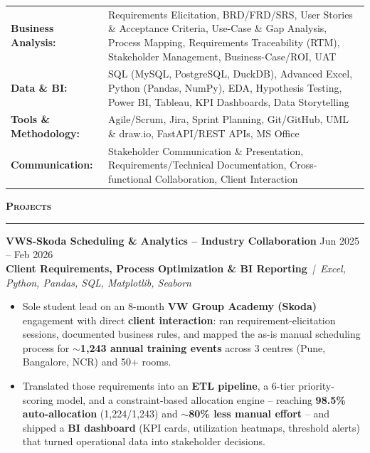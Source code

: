 \documentclass[a4paper,10pt]{article}
\newcommand{\sectionHeader}[2]{%
  \vspace{3.5pt}%
  \noindent%
  {\normalsize\bfseries\color{HeaderDark}#2\enspace\textsc{#1}}%
  \\[-6pt]%
  {\color{SectionLine}\rule{\textwidth}{1pt}}%
  \vspace{1pt}\par%
}
\newcommand{\projectEntry}[4]{%
  \vspace{1pt}%
  \noindent\textbf{\color{HeaderDark}#1} \hfill {\small\color{SubText}#2}\\[-4pt]%
  {\scriptsize\color{AccentTeal}\textbf{#3}} {\scriptsize\color{TechTag}\textit{\,|\, #4}}%
  \vspace{0pt}\par%
}
\begin{document}
\vspace{1pt}
\begin{tabularx}{\textwidth}{@{}l X@{}}
  {\small\textbf{\color{HeaderDark}Business Analysis:}} & {\small Requirements Elicitation, BRD/FRD/SRS, User Stories \& Acceptance Criteria, Use-Case \& Gap Analysis, Process Mapping, Requirements Traceability (RTM), Stakeholder Management, Business-Case/ROI, UAT} \\[2pt]
  {\small\textbf{\color{HeaderDark}Data \& BI:}} & {\small SQL (MySQL, PostgreSQL, DuckDB), Advanced Excel, Python (Pandas, NumPy), EDA, Hypothesis Testing, Power BI, Tableau, KPI Dashboards, Data Storytelling} \\[2pt]
  {\small\textbf{\color{HeaderDark}Tools \& Methodology:}} & {\small Agile/Scrum, Jira, Sprint Planning, Git/GitHub, UML \& draw.io, FastAPI/REST APIs, MS Office} \\[2pt]
  {\small\textbf{\color{HeaderDark}Communication:}} & {\small Stakeholder Communication \& Presentation, Requirements/Technical Documentation, Cross-functional Collaboration, Client Interaction} \\
\end{tabularx}


\sectionHeader{Projects}{\faProjectDiagram}

\projectEntry{VWS-Skoda Scheduling \& Analytics -- Industry Collaboration}
  {Jun 2025 -- Feb 2026}
  {Client Requirements, Process Optimization \& BI Reporting}
  {Excel, Python, Pandas, SQL, Matplotlib, Seaborn}

\begin{itemize}[leftmargin=14pt, itemsep=0pt, parsep=0pt, topsep=1pt, label={\color{BulletColor}\textbf{--}}]
  \item {\small Sole student lead on an 8-month \textbf{VW Group Academy (Skoda)} engagement with direct \textbf{client interaction}: ran requirement-elicitation sessions, documented business rules, and mapped the as-is manual scheduling process for \textbf{$\sim$1,243 annual training events} across 3 centres (Pune, Bangalore, NCR) and 50+ rooms.}
  \item {\small Translated those requirements into an \textbf{ETL pipeline}, a 6-tier priority-scoring model, and a constraint-based allocation engine -- reaching \textbf{98.5\% auto-allocation} (1,224/1,243) and \textbf{$\sim$80\% less manual effort} -- and shipped a \textbf{BI dashboard} (KPI cards, utilization heatmaps, threshold alerts) that turned operational data into stakeholder decisions.}
\end{itemize}
\end{document}
